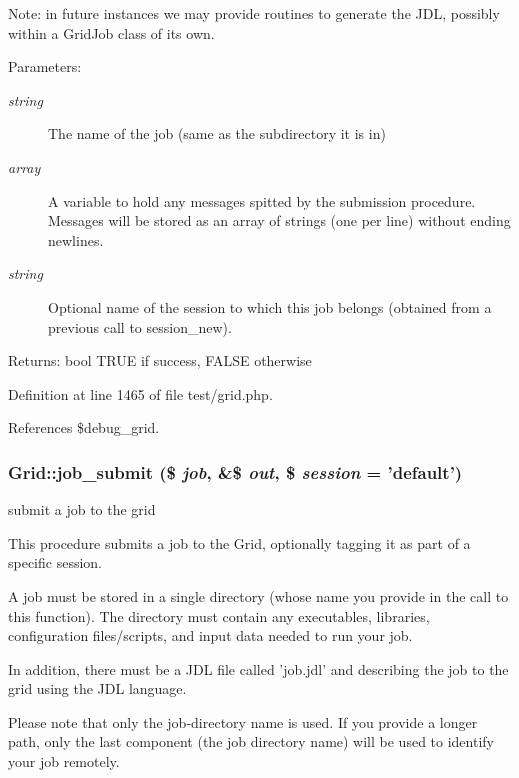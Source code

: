 \begin{Desc}
\item[Note:]in future instances we may provide routines to generate the JDL, possibly within a Grid\-Job class of its own.\end{Desc}
\begin{Desc}
\item[Parameters:]
\begin{description}
\item[{\em string}]The name of the job (same as the subdirectory it is in) \item[{\em array}]A variable to hold any messages spitted by the submission procedure. Messages will be stored as an array of strings (one per line) without ending newlines. \item[{\em string}]Optional name of the session to which this job belongs (obtained from a previous call to session\_\-new). \end{description}
\end{Desc}
\begin{Desc}
\item[Returns:]bool TRUE if success, FALSE otherwise \end{Desc}


Definition at line 1465 of file test/grid.php.

References \$debug\_\-grid.
\subsubsection{\setlength{\rightskip}{0pt plus 5cm}Grid::job\_\-submit (\$ {\em job}, \&\$ {\em out}, \$ {\em session} = 'default')}\label{classGrid_a21}


submit a job to the grid 

This procedure submits a job to the Grid, optionally tagging it as part of a specific session.

A job must be stored in a single directory (whose name you provide in the call to this function). The directory must contain any executables, libraries, configuration files/scripts, and input data needed to run your job.

In addition, there must be a JDL file called 'job.jdl' and describing the job to the grid using the JDL language.

Please note that only the job-directory name is used. If you provide a longer path, only the last component (the job directory name) will be used to identify your job remotely.

